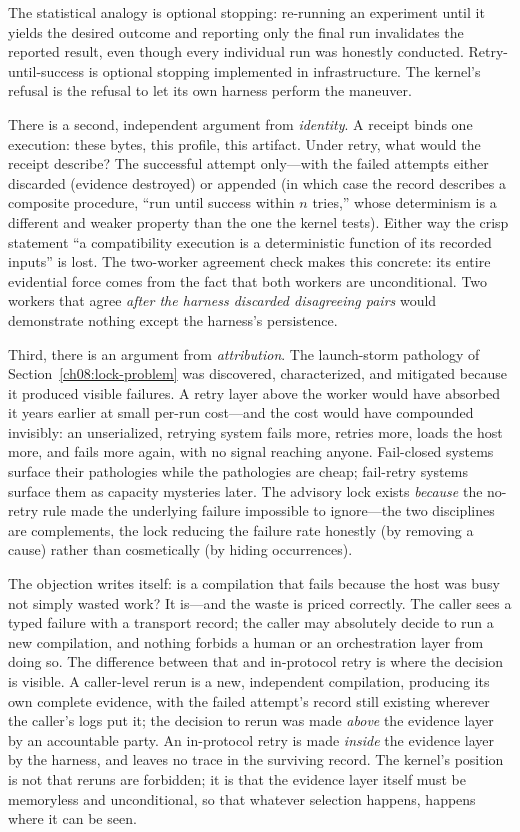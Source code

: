 The statistical analogy is optional stopping: re-running an experiment until it yields the desired outcome and reporting only the final run invalidates the reported result, even though every individual run was honestly conducted. Retry-until-success is optional stopping implemented in infrastructure. The kernel's refusal is the refusal to let its own harness perform the maneuver.

There is a second, independent argument from \emph{identity}. A receipt binds one execution: these bytes, this profile, this artifact. Under retry, what would the receipt describe? The successful attempt only---with the failed attempts either discarded (evidence destroyed) or appended (in which case the record describes a composite procedure, ``run until success within $n$ tries,'' whose determinism is a different and weaker property than the one the kernel tests). Either way the crisp statement ``a compatibility execution is a deterministic function of its recorded inputs'' is lost. The two-worker agreement check makes this concrete: its entire evidential force comes from the fact that both workers are unconditional. Two workers that agree \emph{after the harness discarded disagreeing pairs} would demonstrate nothing except the harness's persistence.

Third, there is an argument from \emph{attribution}. The launch-storm pathology of Section~\ref{ch08:lock-problem} was discovered, characterized, and mitigated because it produced visible failures. A retry layer above the worker would have absorbed it years earlier at small per-run cost---and the cost would have compounded invisibly: an unserialized, retrying system fails more, retries more, loads the host more, and fails more again, with no signal reaching anyone. Fail-closed systems surface their pathologies while the pathologies are cheap; fail-retry systems surface them as capacity mysteries later. The advisory lock exists \emph{because} the no-retry rule made the underlying failure impossible to ignore---the two disciplines are complements, the lock reducing the failure rate honestly (by removing a cause) rather than cosmetically (by hiding occurrences).

The objection writes itself: is a compilation that fails because the host was busy not simply wasted work? It is---and the waste is priced correctly. The caller sees a typed failure with a transport record; the caller may absolutely decide to run a new compilation, and nothing forbids a human or an orchestration layer from doing so. The difference between that and in-protocol retry is where the decision is visible. A caller-level rerun is a new, independent compilation, producing its own complete evidence, with the failed attempt's record still existing wherever the caller's logs put it; the decision to rerun was made \emph{above} the evidence layer by an accountable party. An in-protocol retry is made \emph{inside} the evidence layer by the harness, and leaves no trace in the surviving record. The kernel's position is not that reruns are forbidden; it is that the evidence layer itself must be memoryless and unconditional, so that whatever selection happens, happens where it can be seen.

